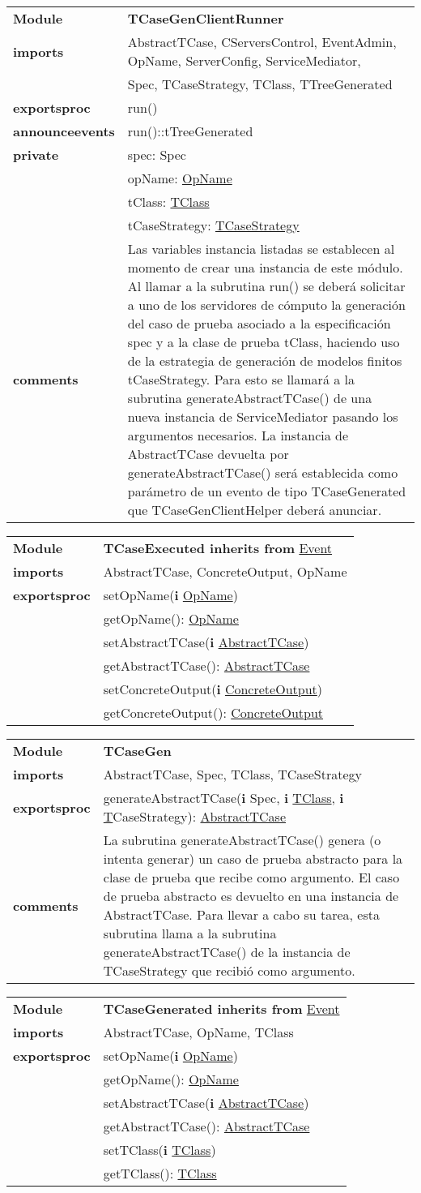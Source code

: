 \documentclass[12pt,a4paper,fleqn]{report}
\newenvironment{module}[1]{\hypertarget{mi:#1}{} \vspace{0.5cm}\noindent\begin{tabular}{|p{0.2\textwidth} p{0.75\textwidth}|} \hline{\bf Module} & {\bf #1} \\}{\hline\end{tabular}\vspace{0.5cm}}
\newenvironment{hmodule}[2]{\hypertarget{mi:#1}{} \vspace{0.5cm}\noindent\begin{tabular}{|p{0.2\textwidth} p{0.75\textwidth}|} \hline{\bf Module} & {\bf #1 inherits from} \hyperlink{mi:#2}{#2} \\}{\hline\end{tabular}\vspace{0.5cm}}
\newcommand{\eproc}{{\bf exportsproc}}
\newcommand{\annev}{{\bf announceevents}}
\newcommand{\priv}{{\bf private}}
\newcommand{\proc}[1]{& #1 \\}
\newcommand{\e}[1]{{\bf i} \hyperlink{mi:#1}{#1}}
\newcommand{\eb}[1]{{\bf i} #1}
\newcommand{\imp}[1]{{\bf imports} & #1 \\}
\newcommand{\comm}[1]{{\bf comments} & #1 \\}
\newcommand{\mdr}[1]{\hyperlink{mi:#1}{#1}}
\newcommand{\extraline}[1]{& #1 \\}
\begin{document}
\begin{module}{TCaseGenClientRunner}
\imp{AbstractTCase, CServersControl, EventAdmin, OpName, ServerConfig, ServiceMediator, }
\extraline{Spec, TCaseStrategy, TClass, TTreeGenerated}
\eproc
\proc{run()}
\annev
\proc{run()::tTreeGenerated}
\priv
\proc{spec: Spec}
\proc{opName: \mdr{OpName}}
\proc{tClass: \mdr{TClass}}
\proc{tCaseStrategy: \mdr{TCaseStrategy}}
\comm{Las variables instancia listadas se establecen al momento de crear una instancia de este módulo. Al llamar a la subrutina run() se deberá solicitar a uno de los servidores de cómputo la generación del caso de prueba asociado a la especificación spec y a la clase de prueba tClass, haciendo uso de la estrategia de generación de modelos finitos tCaseStrategy. Para esto se llamará a la subrutina generateAbstractTCase() de una nueva instancia de ServiceMediator pasando los argumentos necesarios. La instancia de AbstractTCase devuelta por generateAbstractTCase() será establecida como parámetro de un evento de tipo TCaseGenerated que TCaseGenClientHelper deberá anunciar.} 
\end{module}



\begin{hmodule}{TCaseExecuted}{Event}
\imp{AbstractTCase, ConcreteOutput, OpName}
\eproc
\proc{setOpName(\e {OpName})}
\proc{getOpName(): \mdr{OpName}}
\proc{setAbstractTCase(\e {AbstractTCase})}
\proc{getAbstractTCase(): \mdr{AbstractTCase}}
\proc{setConcreteOutput(\e {ConcreteOutput})}
\proc{getConcreteOutput(): \mdr{ConcreteOutput}}
\end{hmodule}



\begin{module}{TCaseGen}
\imp{AbstractTCase, Spec, TClass, TCaseStrategy}
\eproc
\proc{generateAbstractTCase(\eb {Spec}, \e {TClass}, \e TCaseStrategy): \mdr{AbstractTCase}}
\comm{La subrutina generateAbstractTCase() genera (o intenta generar) un caso de prueba abstracto para la clase de prueba que recibe como argumento. El caso de prueba abstracto es devuelto en una instancia de AbstractTCase. Para llevar a cabo su tarea, esta subrutina llama a la subrutina generateAbstractTCase() de la instancia de TCaseStrategy que recibió como argumento.}
\end{module}



\begin{hmodule}{TCaseGenerated}{Event}
\imp{AbstractTCase, OpName, TClass}
\eproc
\proc{setOpName(\e {OpName})}
\proc{getOpName(): \mdr{OpName}}
\proc{setAbstractTCase(\e {AbstractTCase})}
\proc{getAbstractTCase(): \mdr{AbstractTCase}}
\proc{setTClass(\e {TClass})}
\proc{getTClass(): \mdr{TClass}}
\end{hmodule}
\end{document}
